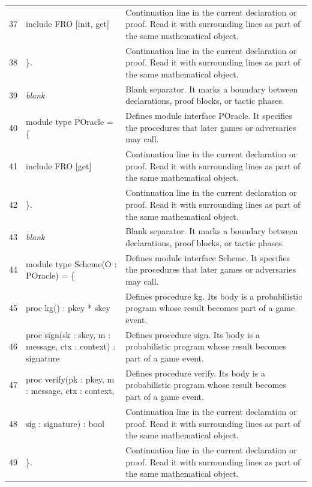 \documentclass[10pt]{article}
\begin{document}
\begin{longtable}{r L{0.53\textwidth} L{0.37\textwidth}}
37 & {\ttfamily\scriptsize   include FRO [init, get]} & Continuation line in the current declaration or proof.  Read it with surrounding lines as part of the same mathematical object. \\
38 & {\ttfamily\scriptsize \}.} & Continuation line in the current declaration or proof.  Read it with surrounding lines as part of the same mathematical object. \\
39 & {\ttfamily\scriptsize \emph{blank}} & Blank separator.  It marks a boundary between declarations, proof blocks, or tactic phases. \\
40 & {\ttfamily\scriptsize module type POracle = \{} & Defines module interface POracle.  It specifies the procedures that later games or adversaries may call. \\
41 & {\ttfamily\scriptsize   include FRO [get]} & Continuation line in the current declaration or proof.  Read it with surrounding lines as part of the same mathematical object. \\
42 & {\ttfamily\scriptsize \}.} & Continuation line in the current declaration or proof.  Read it with surrounding lines as part of the same mathematical object. \\
43 & {\ttfamily\scriptsize \emph{blank}} & Blank separator.  It marks a boundary between declarations, proof blocks, or tactic phases. \\
44 & {\ttfamily\scriptsize module type Scheme(O : POracle) = \{} & Defines module interface Scheme.  It specifies the procedures that later games or adversaries may call. \\
45 & {\ttfamily\scriptsize   proc kg() : pkey * skey} & Defines procedure kg.  Its body is a probabilistic program whose result becomes part of a game event. \\
46 & {\ttfamily\scriptsize   proc sign(sk : skey, m : message, ctx : context) : signature} & Defines procedure sign.  Its body is a probabilistic program whose result becomes part of a game event. \\
47 & {\ttfamily\scriptsize   proc verify(pk : pkey, m : message, ctx : context,} & Defines procedure verify.  Its body is a probabilistic program whose result becomes part of a game event. \\
48 & {\ttfamily\scriptsize               sig : signature) : bool} & Continuation line in the current declaration or proof.  Read it with surrounding lines as part of the same mathematical object. \\
49 & {\ttfamily\scriptsize \}.} & Continuation line in the current declaration or proof.  Read it with surrounding lines as part of the same mathematical object. \\

\end{longtable}
\end{document}
